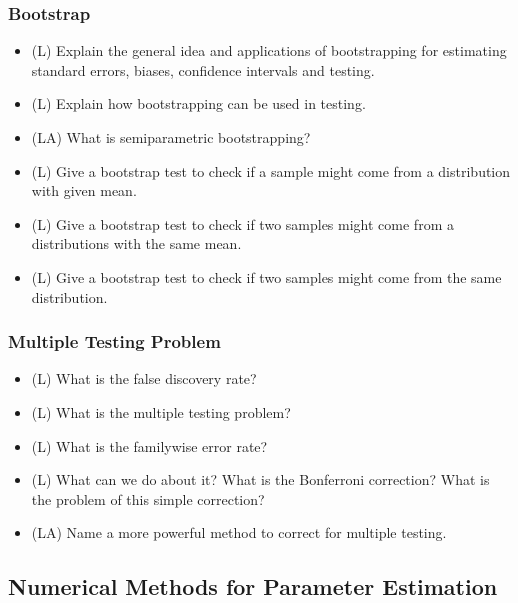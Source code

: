 \subsubsection*{Bootstrap}
\begin{itemize}
    \item (L) Explain the general idea and applications of bootstrapping for estimating standard errors, biases, confidence intervals and testing.
    \answerboxL
    \item (L) Explain how bootstrapping can be used in testing.
    \answerboxM
    \item (LA) What is semiparametric bootstrapping?
    \answerboxS
    \item (L) Give a bootstrap test to check if a sample might come from a distribution with given mean.
    \answerboxM
    \item (L) Give a bootstrap test to check if two samples might come from a distributions with the same mean.
    \answerboxM
    \item (L) Give a bootstrap test to check if two samples might come from the same distribution.
    \answerboxM
\end{itemize}

\subsubsection*{Multiple Testing Problem}
\begin{itemize}
    \item (L) What is the false discovery rate?
    \answerboxS
    \item (L) What is the multiple testing problem?
    \answerboxM
    \item (L) What is the familywise error rate?
    \answerboxS
    \item (L) What can we do about it? What is the Bonferroni correction? What is the problem of this simple correction?
    \answerboxM
    \item (LA) Name a more powerful method to correct for multiple testing.
    \answerboxS
\end{itemize}

\subsection*{Numerical Methods for Parameter Estimation}


